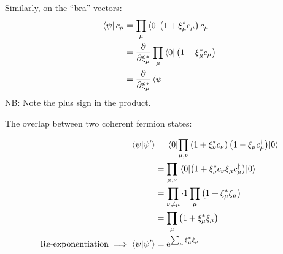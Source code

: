 Similarly, on the ``bra'' vectors:
\begin{align*}
\bra\psi c_\mu &= \prod_{\mu}\bra 0 \left(1+\xi_\mu^*c_\mu\right)c_\mu \\
&=\pdv{\xi_\mu^*}\prod_{\mu}\bra 0 \left(1+\xi_\mu^*c_\mu\right)\\
&= \pdv{\xi_\mu^*}\bra\psi
\end{align*}
NB: Note the plus sign in the product.

The overlap between two coherent fermion states:

\begin{align*}
\braket{\psi}{\psi'} &= \mel{0}{\prod_{\mu, \nu}\left(1+\xi_{\nu}^*c_{\nu}\right)\left(1-\xi_\mu c_\mu^\dagger\right)}{0} \\
&= \prod_{\mu, \nu}\mel{0}{\left(1+\xi_{\nu}^*c_{\nu}\xi_\mu c_\mu^\dagger\right)}{0}\\
&=\prod_{\nu \ne \mu}\cdot 1 \prod_{\mu}\left(1+\xi_\mu^*\xi_\mu\right) \\
&= \prod_{\mu}\left(1+\xi_\mu^*\xi_\mu\right) \\
\text{Re-exponentiation} \implies \braket{\psi}{\psi'} &= \mathrm{e}^{\sum_\mu\xi_\mu^*\xi_\mu}
\end{align*}